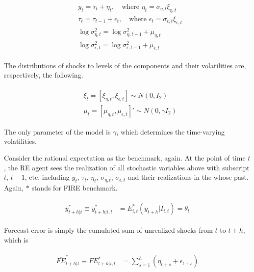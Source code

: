 \documentclass[12pt]{article}
\begin{document}
	\begin{eqnarray}
	\begin{split}
	& y_t = \tau_t + \eta_t,\quad \textrm{where } \eta_t =\sigma_{\eta,t} \xi_{\eta,t} \\
	& \tau_t = \tau_{t-1} + \epsilon_t, \quad \textrm{where }  \epsilon_t =\sigma_{\epsilon,t} \xi_{\epsilon,t} \\
	& \log\sigma^2_{\eta,t} = \log\sigma^2_{\eta,t-1} + \mu_{\eta,t} \\
	& \log\sigma^2_{\epsilon,t} = \log\sigma^2_{\epsilon,t-1} + \mu_{\epsilon,t} 
	\end{split}
	\end{eqnarray}
	
	The distributions of shocks to levels of the components and their volatilities are, respectively, the following.
	
	\begin{eqnarray}
	\begin{split}
	& \xi_t =[\xi_{\eta,t},\xi_{\epsilon,t}] \sim N(0,I_2) \\
	& \mu_{t} = [\mu_{\eta,t},\mu_{\epsilon,t}]' \sim N(0,\gamma I_2) 
	\end{split}
	\end{eqnarray}
	
	The only parameter of the model is $\gamma$, which determines the time-varying volatilities. 
	
	Consider the rational expectation as the benchmark, again. At the point of time $t$, the RE agent sees the realization of all stochastic variables above with subscript $t$, $t-1$, etc, including $y_t$, $\tau_t$, $\eta_t$, $\sigma_{\eta,t}$, $\sigma_{\epsilon,t}$ and their realizations in the whose past. Again, $*$ stands for FIRE benchmark. 
	
	\begin{eqnarray}
	\begin{split}
	\overline y^*_{t+h|t} \equiv y^*_{t+h|i,t} & =  E^*_{i,t}(y_{t+h}|I_{i,t}) = \theta_t 
	\end{split}
	\end{eqnarray}
	
	Forecast error is simply the cumulated sum of unrealized shocks from $t$ to $t+h$, which is 
	
	\begin{eqnarray}
	\begin{split}
	\overline{FE}^*_{t+h|t} \equiv  FE^*_{t+h|i,t} & =  \sum^{h}_{s=1} (\eta_{t+s} + \epsilon_{t+s})
	\end{split}
	\end{eqnarray}
	
\end{document}
